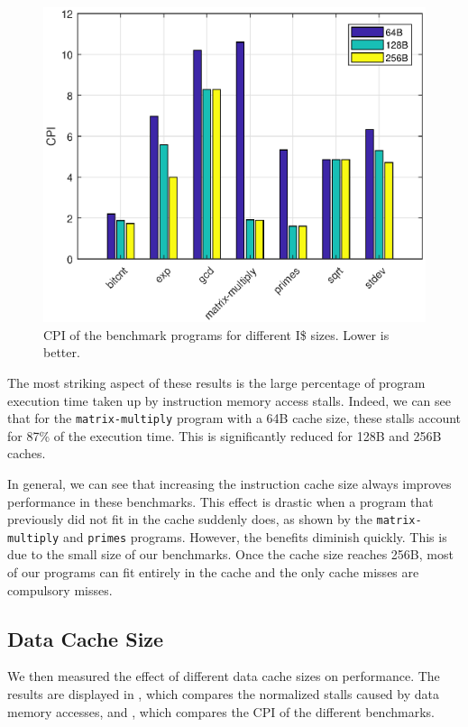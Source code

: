 \documentclass[conference,hidelinks]{IEEEtran}
\begin{document}
\begin{figure}[!htb]
  \centering
  \includegraphics[width=0.8\columnwidth]{plots/instruction_cache_cpi.eps}
  \caption{CPI of the benchmark programs for different I\$ sizes. Lower is better.}
  \label{fig:instruction_cache_cpi}
\end{figure}

The most striking aspect of these results is the large percentage of program execution time taken up by instruction memory access stalls. Indeed, we can see that for the \texttt{matrix-multiply} program with a 64B cache size, these stalls account for 87\% of the execution time. This is significantly reduced for 128B and 256B caches.

In general, we can see that increasing the instruction cache size always improves performance in these benchmarks. This effect is drastic when a program that previously did not fit in the cache suddenly does, as shown by the \texttt{matrix-multiply} and \texttt{primes} programs. However, the benefits diminish quickly. This is due to the small size of our benchmarks. Once the cache size reaches 256B, most of our programs can fit entirely in the cache and the only cache misses are compulsory misses.

\subsection{Data Cache Size}

We then measured the effect of different data cache sizes on performance. The results are displayed in , which compares the normalized stalls caused by data memory accesses, and , which compares the CPI of the different benchmarks.
\end{document}
